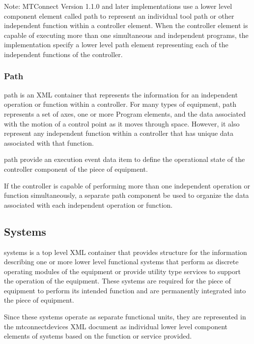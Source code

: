 \documentclass{mtconnect}	%
\begin{document}
\begin{note}
Note: MTConnect Version 1.1.0 and later implementations \should use a \gls{lower level} \gls{component} element called \gls{path} to represent an individual tool path or other independent function within a \gls{controller} element.  When the \gls{controller} element is capable of executing more than one simultaneous and independent programs, the implementation \must specify a \gls{lower level} \gls{path} element representing each of the independent functions of the \gls{controller}.

\end{note}

\subsubsection{Path}

\gls{path} is an XML container that represents the information for an independent operation or function within a \gls{controller}.  For many types of equipment, \gls{path} represents a set of \gls{axes}, one or more Program elements, and the data associated with the motion of a control point as it moves through space.   However, it \may also represent any independent function within a \gls{controller} that has unique data associated with that function.

\gls{path} \should provide an \gls{execution event} data item to define the operational state of the \gls{controller} component of the piece of equipment.

If the \gls{controller} is capable of performing more than one independent operation or function simultaneously, a separate \gls{path} component \must be used to organize the data associated with each independent operation or function.

\subsection{Systems}

\gls{systems} is a \gls{top level} XML container that provides structure for the information describing one or more \gls{lower level} functional systems that perform as discrete operating modules of the equipment or provide utility type services to support the operation of the equipment. These systems are required for the piece of equipment to perform its intended function and are permanently integrated into the piece of equipment.

Since these systems operate as separate functional units, they are represented in the \gls{mtconnectdevices} XML document as individual \gls{lower level} \gls{component} elements of \gls{systems} based on the function or service provided. 
\end{document}
